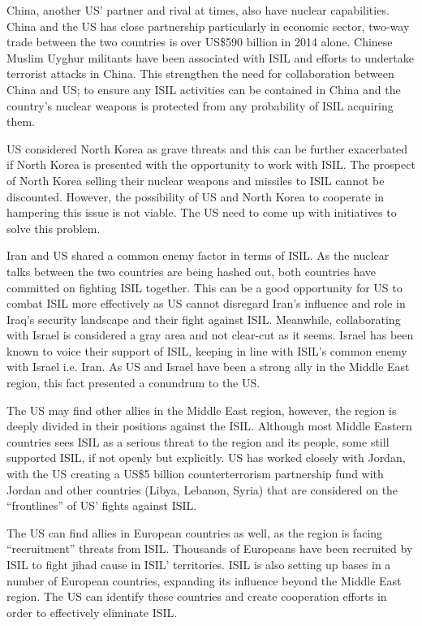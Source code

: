 \documentclass{report}
\begin{document}
China, another US’ partner and rival at times, also have nuclear capabilities. China and the US has close partnership particularly in economic sector, two-way trade between the two countries is over US\$590 billion in 2014 alone. Chinese Muslim Uyghur militants have been associated with ISIL and efforts to undertake terrorist attacks in China. This strengthen the need for collaboration between China and US; to ensure any ISIL activities can be contained in China and the country’s nuclear weapons is protected from any probability of ISIL acquiring them.

US considered North Korea as grave threats and this can be further exacerbated if North Korea is presented with the opportunity to work with ISIL. The prospect of North Korea selling their nuclear weapons and missiles to ISIL cannot be discounted. However, the possibility of US and North Korea to cooperate in hampering this issue is not viable. The US need to come up with initiatives to solve this problem.

Iran and US shared a common enemy factor in terms of ISIL. As the nuclear talks between the two countries are being hashed out, both countries have committed on fighting ISIL together. This can be a good opportunity for US to combat ISIL more effectively as US cannot disregard Iran’s influence and role in Iraq’s security landscape and their fight against ISIL.
Meanwhile, collaborating with Israel is considered a gray area and not clear-cut as it seems. Israel has been known to voice their support of ISIL, keeping in line with ISIL’s common enemy with Israel i.e. Iran. As US and Israel have been a strong ally in the Middle East region, this fact presented a conundrum to the US.

The US may find other allies in the Middle East region, however, the region is deeply divided in their positions against the ISIL. Although most Middle Eastern countries sees ISIL as a serious threat to the region and its people, some still supported ISIL, if not openly but explicitly. US has worked closely with Jordan, with the US creating a US\$5 billion counterterrorism partnership fund with Jordan and other countries (Libya, Lebanon, Syria) that are considered on the \enquote{frontlines} of US’ fights against ISIL.

The US can find allies in European countries as well, as the region is facing \enquote{recruitment} threats from ISIL. Thousands of Europeans have been recruited by ISIL to fight jihad cause in ISIL’ territories. ISIL is also setting up bases in a number of European countries, expanding its influence beyond the Middle East region. The US can identify these countries and create cooperation efforts in order to effectively eliminate ISIL.
\end{document}
